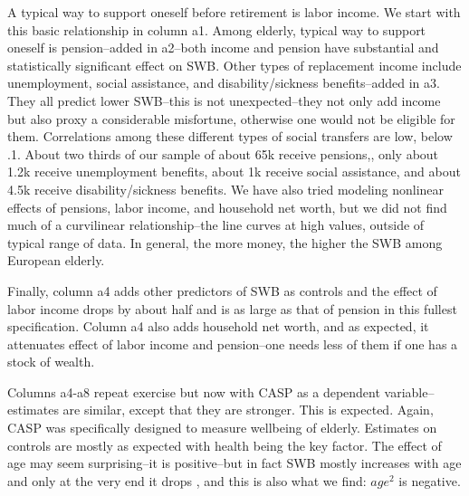 \documentclass[10pt, letterpaper]{article}
\begin{document}
\begin{spacing}{1.4}
A typical way to support oneself
before retirement is labor
income. We start with this basic relationship in column a1. Among elderly,
 typical way to support oneself is pension--added in a2--both income and pension 
have substantial and statistically significant effect on SWB. 
%
%
Other types of replacement income include unemployment, social assistance, and disability/sickness
benefits--added in a3. They all predict lower SWB--this is not unexpected--they not only add income but also proxy a considerable misfortune,
otherwise one would not be eligible for them. 
%
Correlations among these different types of social transfers are low, below
.1. About two thirds of our 
sample of about 65k receive pensions,, only about 1.2k receive
unemployment benefits,  about 1k receive social assistance, and about 4.5k
receive disability/sickness benefits.
%
We have also tried modeling nonlinear effects of pensions, labor income, and household
net worth, but we did not find much of a curvilinear
relationship--the line curves at high values, outside of typical range of data. %
In general, the more money, the higher the SWB among European elderly. 


Finally, column a4 adds other predictors of SWB as controls and the effect of labor income drops by
about half
and is as large as that of pension in this fullest specification. Column a4 also adds household net
worth, and as expected, it attenuates effect of labor income and pension--one
needs less of them if one has a stock of wealth. 
%

Columns a4-a8 repeat exercise but now with CASP as a dependent
variable--estimates are similar, except that they are
stronger. This is expected. Again, CASP was  specifically designed
to measure wellbeing of elderly. 
%
%
%
%
Estimates on controls are mostly as expected with health being the key
factor. The effect of age may seem surprising--it is  positive--but in fact SWB mostly
increases with age and only at the very end it drops \citep{gwozdz10}, and this
is also what we find: $age^2$ is negative.


\end{spacing}
\end{document}
